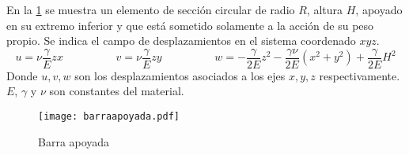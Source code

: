 \documentclass[../notas medios.tex]{subfiles}
\begin{document}
%
En la  \cref{BarApo} se muestra un elemento de secci\'on circular de radio $R$, altura $H$, apoyado en su extremo inferior y que est\'a sometido solamente a la acci\'on de su peso propio. Se indica el campo de desplazamientos en el sistema coordenado $xyz$.\\
%
\begin{equation*}	
	u= \nu \dfrac{\gamma}{E} z x 
	\hspace{2cm}
	v= \nu \dfrac{\gamma}{E} z y 
	\hspace{2cm}
	w= -\dfrac{\gamma}{2E} z^2 - \dfrac{\gamma \nu}{2E} (x^2+y^2)+\dfrac{\gamma}{2E} H^2  
\end{equation*}
%
Donde 	$u,v,w$ son los desplazamientos asociados a los ejes $x,y,z$ respectivamente. $E$, $\gamma$ y $\nu$ son constantes del material. \\ 		
\begin{figure}[h]
	\centering
	\texttt{[image: barraapoyada.pdf]}
	\caption{Barra apoyada}
	 \label{BarApo}
\end{figure}\\
%
\end{document}

